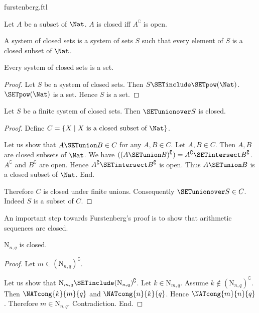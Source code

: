 \documentclass{stex}
\newcommand{\N}{\mathrm{N}}
\begin{document}
\begin{smodule}{furstenberg.ftl}
\begin{forthel}
  \begin{definition}
    Let $A$ be a subset of $\Nat$.
    $A$ is closed iff $A^\complement$ is open.
  \end{definition}

  \begin{definition}
    A system of closed sets is a system of sets $S$ such that every element of
    $S$ is a closed subset of $\Nat$.
  \end{definition}

  \begin{lemma}
    Every system of closed sets is a set.
  \end{lemma}
  \begin{proof}
    Let $S$ be a system of closed sets.
    Then $S \SETinclude \SETpow(\Nat)$.
    $\SETpow(\Nat)$ is a set.
    Hence $S$ is a set.
  \end{proof}

  \begin{lemma}
    Let $S$ be a finite system of closed sets.
    Then $\SETunionover S$ is closed.
  \end{lemma}
  \begin{proof}
    Define $C = \{ X \mid X \text{ is a closed subset of } \Nat \}$.

    Let us show that $A \SETunion B \in C$ for any $A, B \in C$.
      Let $A, B \in C$.
      Then $A, B$ are closed subsets of $\Nat$.
      We have $((A \SETunion B)^\complement) = A^\complement \SETintersect B^\complement$. %
      $A^\complement$ and $B^\complement$ are open.
      Hence $A^\complement \SETintersect B^\complement$ is open.
      Thus $A \SETunion B$ is a closed subset of $\Nat$.
    End.

    Therefore $C$ is closed under finite unions.
    Consequently $\SETunionover S \in C$.
    Indeed $S$ is a subset of $C$.
  \end{proof}
\end{forthel}

An important step towards Furstenberg's proof is to show that arithmetic
sequences are closed.

\begin{forthel}
  \begin{lemma}
    $\N_{n, q}$ is closed.
  \end{lemma}
  \begin{proof}
    Let $m \in (\N_{n, q})^\complement$.

    Let us show that $\N_{m, q} \SETinclude (\N_{n, q})^\complement$.
      Let $k \in \N_{m, q}$.
      Assume $k \notin (\N_{n, q})^\complement$.
      Then $\NATcong{k}{m}{q}$ and $\NATcong{n}{k}{q}$.
      Hence $\NATcong{m}{n}{q}$.
      Therefore $m \in \N_{n, q}$.
      Contradiction.
    End.
  \end{proof}
\end{forthel}


\end{smodule}
\end{document}
